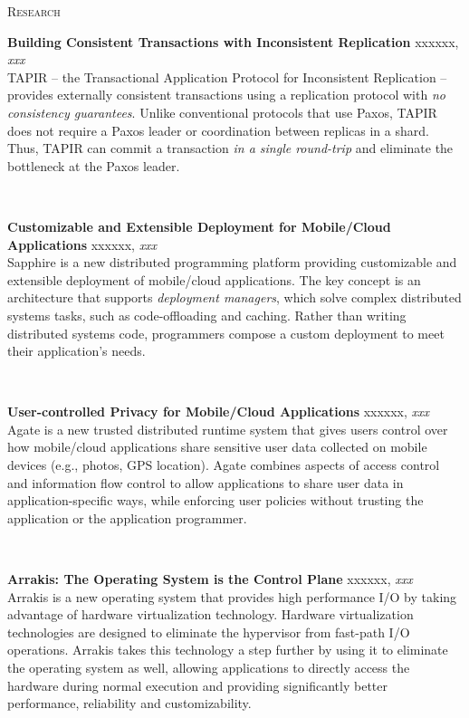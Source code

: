 \documentclass[10pt,times]{report}
\newlength{\sectiongap}
\newlength{\entrygap}
\newlength{\sectioncolwidth}
\newlength{\colgap}
\newlength{\stuffwidth}
\def\ifEqString#1#2{\def\testa{#1}\def\testb{#2}%
  \ifx\testa\testb}
\newenvironment{rtable}{
  \begin{minipage}{\textwidth}
  }{
  \end{minipage}
}
\newenvironment{rentry}[3][xxx]{
  \begin{minipage}[t]{\hsize}
    \textbf{#2}\ifEqString{#1}{xxx}\relax\else, \textit{#1}\fi
    \hspace{\stretch{1}} #3 \\
  }{
    \removelastskip
  \end{minipage}
  \\[\entrygap]  %
}
\newenvironment{rsection}[1]{
  \begin{minipage}[t]{\sectioncolwidth}
    \textsc{#1}
  \end{minipage}
  \hspace{\colgap}
  \begin{minipage}[t]{\stuffwidth}
  }{
    \removelastskip
  \end{minipage}
  \\[\sectiongap]
}
\begin{document}
\begin{rtable}
  \begin{rsection}{Research}
    \begin{rentry}{Building Consistent Transactions with Inconsistent
        Replication}{}
      TAPIR -- the Transactional Application Protocol for Inconsistent
      Replication -- provides externally consistent transactions using a
      replication protocol with \emph{no consistency guarantees}.
      Unlike conventional protocols that use Paxos, TAPIR does not
      require a Paxos leader or coordination between replicas in a
      shard. Thus, TAPIR can commit a transaction \emph{in a single
        round-trip} and eliminate the bottleneck at the Paxos leader.
    \end{rentry}

    \begin{rentry}{Customizable and Extensible Deployment for
        Mobile/Cloud Applications}{}
      Sapphire is a new distributed programming platform providing
      customizable and extensible deployment of mobile/cloud
      applications. The key concept is an architecture that supports
      \emph{deployment managers}, which solve complex distributed
      systems tasks, such as code-offloading and caching. Rather than
      writing distributed systems code, programmers compose a custom
      deployment to meet their application's needs.
    \end{rentry}

    \begin{rentry}{User-controlled Privacy for Mobile/Cloud Applications}{}
      Agate is a new trusted distributed runtime system that gives
      users control over how mobile/cloud applications share sensitive
      user data collected on mobile devices (e.g., photos, GPS
      location). Agate combines aspects of access control and
      information flow control to allow applications to share user
      data in application-specific ways, while enforcing user policies
      without trusting the application or the application programmer.
    \end{rentry}


    \begin{rentry}{Arrakis: The Operating System is the Control Plane}{}
      Arrakis is a new operating system that provides high performance
      I/O by taking advantage of hardware virtualization
      technology. Hardware virtualization technologies are designed to
      eliminate the hypervisor from fast-path I/O operations. Arrakis
      takes this technology a step further by using it to eliminate
      the operating system as well, allowing applications to directly
      access the hardware during normal execution and providing
      significantly better performance, reliability and
      customizability.
    \end{rentry}


\end{rsection}
\end{rtable}
\end{document}
